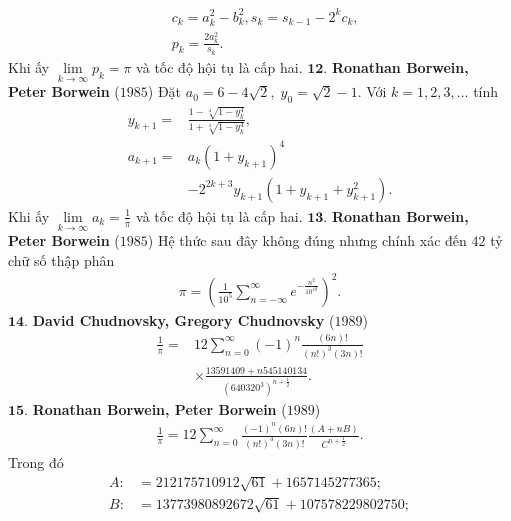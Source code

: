 \begin{multicols}{2}
\begin{align*}
		& {c_k} = a_k^2 - b_k^2, {s_k} = {s_{k - 1}} - {2^k}{c_k}, \\
		&{p_k} = \frac{{2a_k^2}}{{{s_k}}}.
	\end{align*}
	Khi ấy $\mathop {\lim }\limits_{k \to \infty } {p_k} = \pi$   và tốc độ hội tụ là cấp hai. 
	\vskip 0.1cm
	$\pmb{12.}$ \textbf{\color{lichsutoanhoc}Ronathan Borwein, Peter Borwein} ($1985$)
	\vskip 0.1cm
	Đặt ${a_0} = 6 - 4\sqrt 2 ,\;{y_0} = \sqrt 2  - 1.$  
	\vskip 0.1cm
	Với $k = 1,2,3,\ldots$ tính 
	\begin{align*}
		{y_{k + 1}} =& \frac{{1 - \sqrt[4]{{1 - y_k^4}}}}{{1 + \sqrt[4]{{1 - y_k^4}}}},\\
		{a_{k + 1}} =& {a_k}{\left( {1 + {y_{k + 1}}} \right)^4} \\
		&- {2^{2k + 3}}{y_{k + 1}}\left( {1 + {y_{k + 1}} + y_{k + 1}^2} \right).
	\end{align*}
	Khi ấy $\mathop {\lim }\limits_{k \to \infty } {a_k} = \frac{1}{\pi }$  và tốc độ hội tụ là cấp hai.
	\vskip 0.1cm
	$\pmb{13.}$ \textbf{\color{lichsutoanhoc}Ronathan Borwein, Peter Borwein} ($1985$)
	\vskip 0.1cm
	Hệ thức sau đây không đúng nhưng chính xác đến $42$ tỷ chữ số thập phân
	\begin{align*}
		\pi  = {\left( {\frac{1}{{{{10}^5}}}\sum\limits_{n =  - \infty }^\infty  {{e^{ - \frac{{{n^2}}}{{{{10}^{10}}}}}}} } \right)^2}.
	\end{align*}
	$\pmb{14.}$ \textbf{\color{lichsutoanhoc}David Chudnovsky, Gregory Chudnovsky} ($1989$)
	\begin{align*}
		\frac{1}{\pi } =& 12\sum\limits_{n = 0}^\infty  {{{\left( { - 1} \right)}^n}\frac{{\left( {6n} \right)!}}{{{{\left( {n!} \right)}^3}\left( {3n} \right)!}}} \\
		&\times\frac{{13591409 + n545140134}}{{{{\left( {{{640320}^3}} \right)}^{n + \frac{1}{2}}}}}.
	\end{align*}
	$\pmb{15.}$ \textbf{\color{lichsutoanhoc}Ronathan Borwein, Peter Borwein} ($1989$)
	\begin{align*}
		\frac{1}{\pi } = 12\sum\limits_{n = 0}^\infty  {\frac{{{{\left( { - 1} \right)}^n}\left( {6n} \right)!}}{{{{\left( {n!} \right)}^3}\left( {3n} \right)!}}} \frac{{\left( {A + nB} \right)}}{{{C^{n + \frac{1}{2}}}}}.
	\end{align*}
	Trong đó 
	\begin{align*}
			A\!:\! &\!=\! 212175710912\sqrt {61}  \!+\! 1657145277365;\\
			B\!:\! &\!=\! 13773980892672\sqrt {61}  \!+\! 107578229802750;\\

\end{align*}
\end{multicols}
